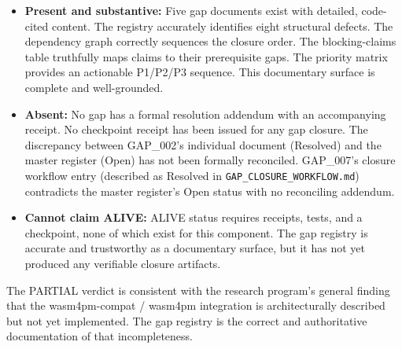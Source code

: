 \begin{itemize}
  \item \textbf{Present and substantive:} Five gap documents exist with detailed,
        code-cited content. The registry accurately identifies eight structural defects.
        The dependency graph correctly sequences the closure order. The blocking-claims
        table truthfully maps claims to their prerequisite gaps. The priority matrix
        provides an actionable P1/P2/P3 sequence. This documentary surface is complete
        and well-grounded.

  \item \textbf{Absent:} No gap has a formal resolution addendum with an accompanying
        receipt. No checkpoint receipt has been issued for any gap closure. The discrepancy
        between GAP\_002's individual document (Resolved) and the master register (Open)
        has not been formally reconciled. GAP\_007's closure workflow entry (described as
        Resolved in \texttt{GAP\_CLOSURE\_WORKFLOW.md}) contradicts the master register's
        Open status with no reconciling addendum.

  \item \textbf{Cannot claim ALIVE:} ALIVE status requires receipts, tests, and a
        checkpoint, none of which exist for this component. The gap registry is accurate
        and trustworthy as a documentary surface, but it has not yet produced any
        verifiable closure artifacts.
\end{itemize}

The PARTIAL verdict is consistent with the research program's general finding that the
wasm4pm-compat / wasm4pm integration is architecturally described but not yet
implemented. The gap registry is the correct and authoritative documentation of that
incompleteness.
